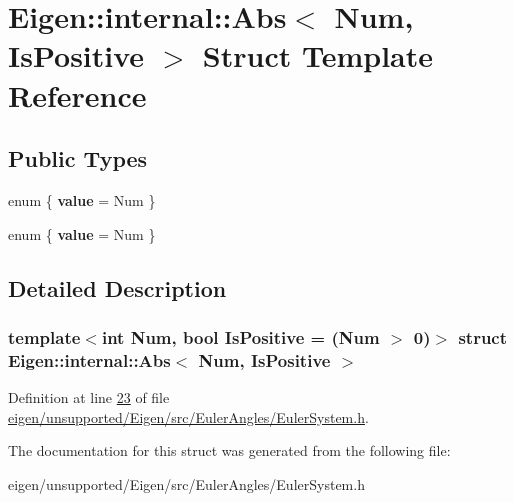 \hypertarget{struct_eigen_1_1internal_1_1_abs}{}\section{Eigen\+:\+:internal\+:\+:Abs$<$ Num, Is\+Positive $>$ Struct Template Reference}
\label{struct_eigen_1_1internal_1_1_abs}
\subsection*{Public Types}
\begin{DoxyCompactItemize}
\item 
\mbox{\label{struct_eigen_1_1internal_1_1_abs_a1a05e306c468188158c0bb77a11a32f0}} 
enum \{ {\bfseries value} = Num
 \}
\item 
\mbox{\label{struct_eigen_1_1internal_1_1_abs_a7414fa1e64f08b66fc69ddcbd503dc32}} 
enum \{ {\bfseries value} = Num
 \}
\end{DoxyCompactItemize}


\subsection{Detailed Description}
\subsubsection*{template$<$int Num, bool Is\+Positive = (\+Num $>$ 0)$>$\newline
struct Eigen\+::internal\+::\+Abs$<$ Num, Is\+Positive $>$}



Definition at line \hyperlink{eigen_2unsupported_2_eigen_2src_2_euler_angles_2_euler_system_8h_source_l00023}{23} of file \hyperlink{eigen_2unsupported_2_eigen_2src_2_euler_angles_2_euler_system_8h_source}{eigen/unsupported/\+Eigen/src/\+Euler\+Angles/\+Euler\+System.\+h}.



The documentation for this struct was generated from the following file\+:\begin{DoxyCompactItemize}
\item 
eigen/unsupported/\+Eigen/src/\+Euler\+Angles/\+Euler\+System.\+h\end{DoxyCompactItemize}
